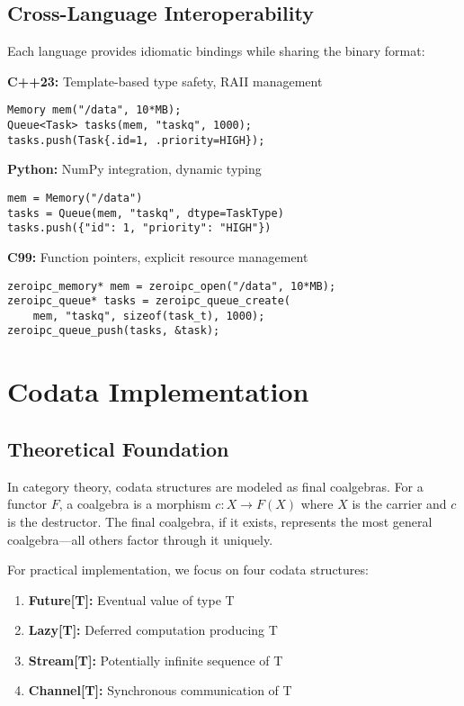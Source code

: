 \documentclass[letterpaper,twocolumn,10pt]{article}
\begin{document}
\subsection{Cross-Language Interoperability}

Each language provides idiomatic bindings while sharing the binary format:

\textbf{C++23:} Template-based type safety, RAII management
\begin{lstlisting}
Memory mem("/data", 10*MB);
Queue<Task> tasks(mem, "taskq", 1000);
tasks.push(Task{.id=1, .priority=HIGH});
\end{lstlisting}

\textbf{Python:} NumPy integration, dynamic typing
\begin{lstlisting}
mem = Memory("/data")
tasks = Queue(mem, "taskq", dtype=TaskType)
tasks.push({"id": 1, "priority": "HIGH"})
\end{lstlisting}

\textbf{C99:} Function pointers, explicit resource management
\begin{lstlisting}
zeroipc_memory* mem = zeroipc_open("/data", 10*MB);
zeroipc_queue* tasks = zeroipc_queue_create(
    mem, "taskq", sizeof(task_t), 1000);
zeroipc_queue_push(tasks, &task);
\end{lstlisting}

\section{Codata Implementation}

\subsection{Theoretical Foundation}

In category theory, codata structures are modeled as final coalgebras. For a functor $F$, a coalgebra is a morphism $c: X \rightarrow F(X)$ where $X$ is the carrier and $c$ is the destructor. The final coalgebra, if it exists, represents the most general coalgebra---all others factor through it uniquely.

For practical implementation, we focus on four codata structures:

\begin{enumerate}
\item \textbf{Future[T]:} Eventual value of type T
\item \textbf{Lazy[T]:} Deferred computation producing T
\item \textbf{Stream[T]:} Potentially infinite sequence of T
\item \textbf{Channel[T]:} Synchronous communication of T
\end{enumerate}
\end{document}
